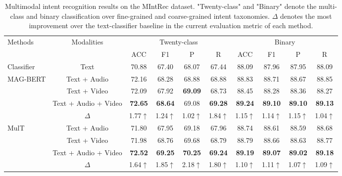 \documentclass[sigconf,camera-ready]{acmart}
\begin{document}
\begin{table*}[t!]\small
			\caption{\label{results-main-1}  
			Multimodal intent recognition results on the MIntRec dataset. "Twenty-class" and "Binary" denote the multi-class and binary classification over fine-grained and coarse-grained intent taxonomies. $\Delta$ denotes the most improvement over the text-classifier baseline in the current evaluation metric of each method.}
	\centering
	\begin{tabular}{@{\extracolsep{3pt}}l|c|cccc|cccc}
		\toprule
		\multirow{2}{*}{Methods} & \multirow{2}{*}{Modalities} 
		& \multicolumn{4}{c|}{Twenty-class}& \multicolumn{4}{c}{Binary}\\
		
		&& ACC  & F1  & P  & R & ACC  & F1  & P & R \\ 
		\midrule
		Classifier & Text & 70.88 & 67.40 & 68.07 & 67.44 & 88.09 & 87.96 &	87.95 &	88.09\\
		\midrule
		\multirow{4}{*}{MAG-BERT} & Text + Audio & 72.16 & 68.28 & 68.88 &	68.88 &	88.83 &	88.71 &	88.67 &	88.85  \\
		& Text + Video & 72.09 & 67.92 & \textbf{69.09} & 68.73 &	88.45 &	88.28 &	88.36 &	88.27 \\
		& Text + Audio + Video & \textbf{72.65} & \textbf{68.64} & 69.08 & \textbf{69.28}  & \textbf{89.24} & \textbf{89.10} & \textbf{89.10}  & \textbf{89.13} \\ 
		& $\Delta$ & 1.77$\uparrow$ & 1.24$\uparrow$ & 1.02$\uparrow$ & 1.84$\uparrow$  & 1.15$\uparrow$ & 1.14$\uparrow$ & 1.15$\uparrow$  & 1.04$\uparrow$ \\ 
		
		\midrule
		\multirow{4}{*}{MulT} & Text + Audio & 71.80 &	67.95 &	69.18 &	67.96 &	88.74 &	88.61 &	88.59 &	88.68 \\
		& Text + Video & 71.98 & 68.76 & 69.68 & 68.79 & 88.79 & 88.66 & 88.63 & 88.77\\
		& Text + Audio + Video & \textbf{72.52} & \textbf{69.25} & \textbf{70.25} & \textbf{69.24}  & \textbf{89.19} & \textbf{89.07} & \textbf{89.02}  & \textbf{89.18} \\
		& $\Delta$& 1.64$\uparrow$ & 1.85$\uparrow$ & 2.18$\uparrow$ & 1.80$\uparrow$  & 1.10$\uparrow$ & 1.11$\uparrow$ & 1.07$\uparrow$  & 1.09$\uparrow$ \\ 
		

\end{tabular}
\end{table*}
\end{document}

